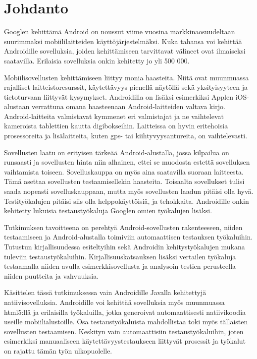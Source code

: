 \section{Johdanto}

Googlen kehittämä Android on noussut viime vuosina markkinaosuudeltaan suurimmaksi mobiililaitteiden käyttöjärjestelmäksi. Kuka tahansa voi kehittää Androidille sovelluksia, joiden kehittämiseen tarvittavat välineet ovat ilmaiseksi saatavilla. Erilaisia sovelluksia onkin kehitetty jo yli 500 000.

Mobiilisovellusten kehittämiseen liittyy monia haasteita. Niitä ovat muunmuassa rajalliset laitteistoresurssit, käytettävyys pienellä näytöllä sekä yksityisyyteen ja tietoturvaan liittyvät kysymykset. Androidilla on lisäksi esimerkiksi Applen iOS-alustaan verrattuna omana haasteenaan Android-laitteiden valtava kirjo. Android-laitteita valmistavat kymmenet eri valmistajat ja ne vaihtelevat kameroista tablettien kautta digibokseihin. Laitteissa on hyvin eritehoisia prosessoreita ja lisälaitteita, kuten gps- tai kiihtyvyysantureita, on vaihtelevasti.

Sovellusten laatu on erityisen tärkeää Android-alustalla, jossa kilpailua on runsaasti ja sovellusten hinta niin alhainen, ettei se muodosta estettä sovelluksen vaihtamista toiseen. Sovelluskauppa on myös aina saatavilla suoraan laitteesta. Tämä asettaa sovellusten testaamisellekin haasteita. Toisaalta sovellukset tulisi saada nopeasti sovelluskauppaan, mutta myös sovellusten laadun pitäisi olla hyvä. Testityökalujen pitäisi siis olla helppokäyttöisiä, ja tehokkaita. Androidille onkin kehitetty lukuisia testaustyökaluja Googlen omien työkalujen lisäksi.

Tutkimuksen tavoitteena on perehtyä Android-sovellusten rakenteeseen, niiden testaamiseen ja Android-alustalla toimiviin automaattisen testauksen työkaluihin. Tutustun kirjallisuudessa esiteltyihin sekä Androidin kehitystyökalujen mukana tuleviin testaustyökaluihin. Kirjallisuuskatsauksen lisäksi vertailen työkaluja testaamalla niiden avulla esimerkkisovellusta ja analysoin testien perusteella niiden puutteita ja vahvuuksia.

Käsittelen tässä tutkimuksessa vain Androidille Javalla kehitettyjä natiivisovelluksia. Androidille voi kehittää sovelluksia myös muunmuassa html5:llä ja erilaisilla työkaluilla, jotka generoivat automaattisesti natiivikoodia useille mobiilialustoille. Osa testaustyökaluista mahdollistaa toki myös tällaisten sovellusten testaamisen. Keskityn vain automaattisiin testaustyökaluihin, joten esimerkiksi manuaaliseen käytettävyystestaukseen liittyvät prosessit ja työkalut on rajattu tämän työn ulkopuolelle.

